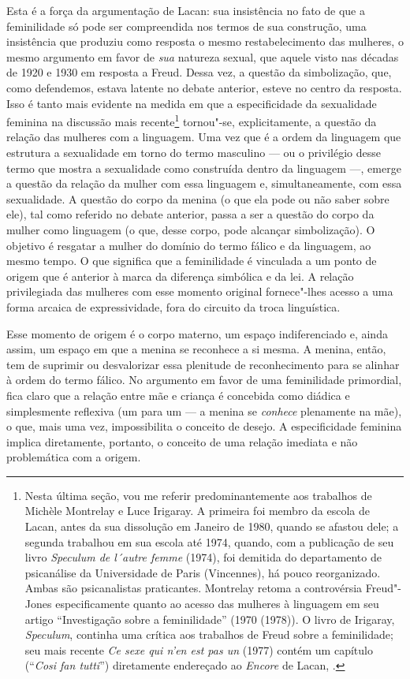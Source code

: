 Esta é a força da argumentação de Lacan: sua insistência no fato de que
a feminilidade só pode ser compreendida nos termos de sua construção,
uma insistência que produziu como resposta o mesmo restabelecimento das
mulheres, o mesmo argumento em favor de \emph{sua} natureza sexual, que
aquele visto nas décadas de 1920 e 1930 em resposta a Freud. Dessa vez,
a questão da simbolização, que, como defendemos, estava latente no
debate anterior, esteve no centro da resposta. Isso é tanto mais
evidente na medida em que a especificidade da sexualidade feminina na
discussão mais recente\footnote{Nesta última seção, vou me referir
  predominantemente aos trabalhos de Michèle Montrelay e Luce Irigaray.
  A primeira foi membro da escola de Lacan, antes da sua dissolução em
  Janeiro de 1980, quando se afastou dele; a segunda trabalhou em sua
  escola até 1974, quando, com a publicação de seu livro \emph{Speculum
  de l´autre femme} (1974), foi demitida do departamento de psicanálise
  da Universidade de Paris  (Vincennes), há pouco reorganizado.
  Ambas são psicanalistas praticantes. Montrelay retoma a controvérsia
  Freud"-Jones especificamente quanto ao acesso das mulheres à linguagem
  em seu artigo ``Investigação sobre a feminilidade'' (1970 (1978)). O
  livro de Irigaray, \emph{Speculum}, continha uma crítica aos trabalhos
  de Freud sobre a feminilidade; seu mais recente \emph{Ce sexe qui n'en
  est pas un} (1977) contém um capítulo (``\emph{Cosi fan tutti}'')
  diretamente endereçado ao \emph{Encore} de Lacan, .} tornou"-se,
explicitamente, a questão da relação das mulheres com a linguagem. Uma
vez que é a ordem da linguagem que estrutura a sexualidade em torno do
termo masculino --- ou o privilégio desse termo que mostra a sexualidade
como construída dentro da linguagem ---, emerge a questão da relação da
mulher com essa linguagem e, simultaneamente, com essa sexualidade. A
questão do corpo da menina (o que ela pode ou não saber sobre ele), tal
como referido no debate anterior, passa a ser a questão do corpo da
mulher como linguagem (o que, desse corpo, pode alcançar simbolização).
O objetivo é resgatar a mulher do domínio do termo fálico e da
linguagem, ao mesmo tempo. O que significa que a feminilidade é
vinculada a um ponto de origem que é anterior à marca da diferença
simbólica e da lei. A relação privilegiada das mulheres com esse momento
original fornece"-lhes acesso a uma forma arcaica de expressividade, fora
do circuito da troca linguística.

Esse momento de origem é o corpo materno, um espaço indiferenciado e,
ainda assim, um espaço em que a menina se reconhece a si mesma. A
menina, então, tem de suprimir ou desvalorizar essa plenitude de
reconhecimento para se alinhar à ordem do termo fálico. No argumento em
favor de uma feminilidade primordial, fica claro que a relação entre mãe
e criança é concebida como diádica e simplesmente reflexiva (um para um
--- a menina se \emph{conhece} plenamente na mãe), o que, mais uma vez,
impossibilita o conceito de desejo. A especificidade feminina implica
diretamente, portanto, o conceito de uma relação imediata e não
problemática com a origem.

